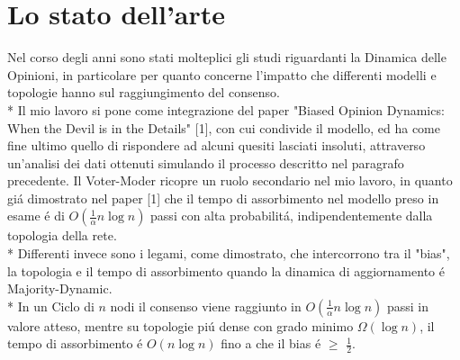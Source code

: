 \documentclass[../Tesi.tex]{subfiles}
\begin{document}
\section{Lo stato dell'arte}
Nel corso degli anni sono stati molteplici gli studi riguardanti la Dinamica delle Opinioni, in particolare per quanto concerne l'impatto che differenti modelli e topologie hanno sul raggiungimento del consenso.\\*
Il mio lavoro si pone come integrazione del paper "Biased Opinion Dynamics: When the Devil is in the Details" [1], con cui condivide il modello, ed ha come fine ultimo quello di rispondere ad alcuni quesiti lasciati insoluti, attraverso un'analisi dei dati ottenuti simulando il processo descritto nel paragrafo precedente.
Il Voter-Moder ricopre un ruolo secondario nel mio lavoro, in quanto gi\'a dimostrato nel paper [1] che il tempo di assorbimento nel modello preso in esame \'e di $O(\frac{1}{\alpha}n\log{}n)$ passi con alta probabilit\'a, indipendentemente dalla topologia della rete.\\*
Differenti invece sono i legami, come dimostrato, che intercorrono tra il "bias", la topologia e il tempo di assorbimento quando la dinamica di aggiornamento \'e Majority-Dynamic.\\*
In un Ciclo di $n$ nodi il consenso viene raggiunto in $O(\frac{1}{\alpha}n\log{}n)$ passi in valore atteso, mentre su topologie pi\'u dense con grado minimo $\Omega(\log{}n)$, il tempo di assorbimento \'e $O(n\log{}n)$ fino a che il bias \'e $\geq$ $\frac{1}{2}$.
\end{document}
